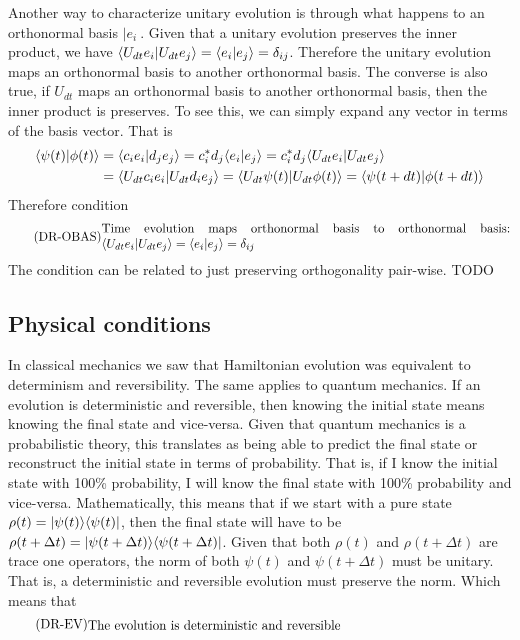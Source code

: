 Another way to characterize unitary evolution is through what happens to an orthonormal basis $|e_i\>$. Given that a unitary evolution preserves the inner product, we have $\langle U_{d t} e_i | U_{d t} e_j \rangle = \langle e_i | e_j \rangle = \delta_{ij}$. Therefore the unitary evolution maps an orthonormal basis to another orthonormal basis. The converse is also true, if $U_{dt}$ maps an orthonormal basis to another orthonormal basis, then the inner product is preserves. To see this, we can simply expand any vector in terms of the basis vector. That is
\begin{equation}
	\begin{aligned}
		\langle\psi(t) | \phi(t)\rangle &= \langle c_i e_i | d_j e_j\rangle = c_i^* d_j \langle e_i | e_j\rangle = c_i^* d_j \langle U_{d t} e_i | U_{d t} e_j\rangle \\
		&= \langle U_{d t} c_i e_i | U_{d t} d_i e_j\rangle = \langle U_{d t} \psi(t) | U_{d t} \phi(t)\rangle = \langle \psi(t + d t) | \phi(t + d t)\rangle \\
	\end{aligned}
\end{equation}
Therefore condition
\begin{equation}\label{rp-qm-uev-condOrthonormalBasis}
	\tag{DR-OBAS}
	\eqtext{Time evolution maps orthonormal basis to orthonormal basis: $\< U_{d t} e_i | U_{d t} e_j \> = \< e_i | e_j \> = \delta_{ij}$} 
\end{equation}
The condition can be related to just preserving orthogonality pair-wise. TODO

\subsection{Physical conditions}

In classical mechanics we saw that Hamiltonian evolution was equivalent to determinism and reversibility. The same applies to quantum mechanics. If an evolution is deterministic and reversible, then knowing the initial state means knowing the final state and vice-versa. Given that quantum mechanics is a probabilistic theory, this translates as being able to predict the final state or reconstruct the initial state in terms of probability. That is, if I know the initial state with 100\% probability, I will know the final state with 100\% probability and vice-versa. Mathematically, this means that if we start with a pure state $\rho(t) = |\psi(t) \rangle \langle \psi(t)|$, then the final state will have to be $\rho(t+\Delta t) = |\psi(t+\Delta t) \rangle \langle \psi(t+\Delta t)|$. Given that both $\rho(t)$ and $\rho(t + \Delta t)$ are trace one operators, the norm of both $\psi(t)$ and $\psi(t+\Delta t)$ must be unitary. That is, a deterministic and reversible evolution must preserve the norm. Which means that 
\begin{equation}\label{rp-qm-uev-condDetRev}
	\tag{DR-EV}
	\eqtext{The evolution is deterministic and reversible} 
\end{equation}

